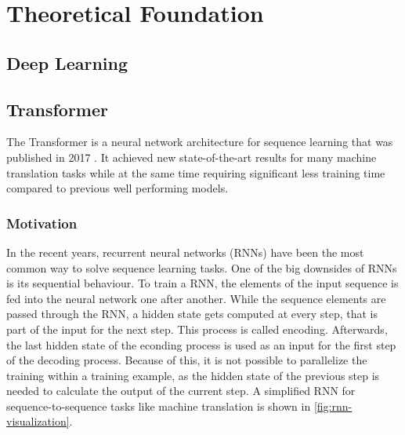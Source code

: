 \chapter{Theoretical Foundation }\label{ch:theoretical-foundation}

\Blindtext


\section{Deep Learning}

\Blindtext


\section{Transformer}\label{sec:transformer}

The Transformer is a neural network architecture for sequence learning that was published in 2017 \cite{1706.03762}.
It achieved new state-of-the-art results for many machine translation tasks while at the same time requiring significant less training time compared to previous well performing models.

\subsection{Motivation}\label{ssec:transformer-motivation}

In the recent years, recurrent neural networks (RNNs) have been the most common way to solve sequence learning tasks.
One of the big downsides of RNNs is its sequential behaviour.
To train a RNN, the elements of the input sequence is fed into the neural network one after another.
While the sequence elements are passed through the RNN, a hidden state gets computed at every step, that is part of the input for the next step.
This process is called encoding.
Afterwards, the last hidden state of the econding process is used as an input for the first step of the decoding process.
Because of this, it is not possible to parallelize the training within a training example, as the hidden state of the previous step is needed to calculate the output of the current step. \cite[p.~2]{1706.03762}
A simplified RNN for sequence-to-sequence tasks like machine translation is shown in \autoref{fig:rnn-visualization}.

